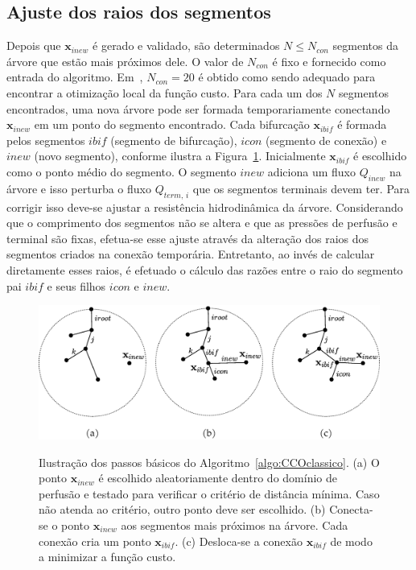 \subsection{Ajuste dos raios dos segmentos}\label{sec:ajuste-dos-raios}

Depois que $\mathbf{x}_{inew}$ é gerado e validado, são determinados $N \leq N_{con}$ 
segmentos da árvore que estão mais próximos dele. O valor de $N_{con}$ é fixo e fornecido 
como entrada do algoritmo. Em~\cite{Karch1999}, $N_{con} = 20$ é obtido como sendo adequado para 
encontrar a otimização local da função custo. Para cada um dos $N$ segmentos encontrados, 
uma nova árvore pode ser formada temporariamente conectando $\mathbf{x}_{inew}$ 
em um ponto do segmento encontrado. Cada bifurcação $\mathbf{x}_{ibif}$ é formada 
pelos segmentos $ibif$ (segmento de bifurcação), $icon$ (segmento de conexão)
e $inew$ (novo segmento), conforme ilustra a Figura~\ref{fig:passos-cco}. 
Inicialmente $\mathbf{x}_{ibif}$ é escolhido como o ponto médio do segmento. 
O segmento $inew$ adiciona um fluxo $Q_{inew}$ na árvore e isso 
perturba o fluxo $Q_{term,\,i}$ que os segmentos terminais devem ter. Para corrigir 
isso deve-se ajustar a resistência hidrodinâmica da árvore. Considerando que o comprimento 
dos segmentos não se altera e que as pressões de perfusão e terminal são fixas, 
efetua-se esse ajuste através da alteração dos raios dos segmentos 
criados na conexão temporária. Entretanto, ao invés de calcular diretamente 
esses raios, é efetuado o cálculo das razões entre o raio do segmento pai $ibif$ 
e seus filhos $icon$ e $inew$.

\begin{figure}[!htb]
  \centering
  \captiondelim{: }
  \caption{Ilustração dos passos básicos do Algoritmo~\ref{algo:CCOclassico}.
    (a) O ponto $\mathbf{x}_{inew}$ é escolhido aleatoriamente dentro do domínio de perfusão
    e testado para verificar o critério de distância mínima. Caso não atenda ao critério, outro
    ponto deve ser escolhido.
    (b) Conecta-se o ponto $\mathbf{x}_{inew}$ aos segmentos mais próximos na árvore. 
    Cada conexão cria um ponto $\mathbf{x}_{ibif}$.
    (c) Desloca-se a conexão $\mathbf{x}_{ibif}$ de modo a minimizar a função custo.
    }
  \includegraphics[scale=0.4]{figuras/modelos-computacionais-de-arvores-circulatorias/passos-algoritmo-cco.eps}
  \label{fig:passos-cco}
\end{figure}

